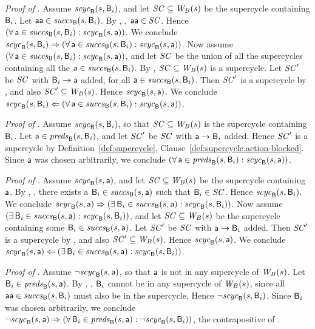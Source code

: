 \textit{Proof of }.
%
Assume $\scyc{\B}{s}{\B_i}$, and let $\SC \sub \wfg{B}{s}$ be the supercycle containing $\B_i$.  Let
$\actp \in \succs{\B}{s}{\B_i}$.  By , ,
$\actp \in \SC$.  Hence $(\fa \act \in \succs{\B}{s}{\B_i} : \scyc{\B}{s}{\act})$.
We conclude
$\scyc{\B}{s}{\B_i} \imp (\fa \act \in \succs{\B}{s}{\B_i} : \scyc{\B}{s}{\act})$.
%
Now assume $(\fa \act \in \succs{\B}{s}{\B_i} : \scyc{\B}{s}{\act})$, and let 
$\SC$ be the union of all the supercycles containing all the $\act \in \succs{\B}{s}{\B_i}$. 
By , $\SC \sub \wfg{B}{s}$ is a supercycle.
Let $\SC'$ be $\SC$ with $\B_i \ar \act$ added, for all 
$\act \in \succs{\B}{s}{\B_i}$.
Then $\SC'$ is a supercycle by 
, and also $\SC' \sub \wfg{B}{s}$. Hence $\scyc{\B}{s}{\act}$.
We conclude 
$\scyc{\B}{s}{\B_i} \folf (\fa \act \in \succs{\B}{s}{\B_i} : \scyc{\B}{s}{\act})$.




\textit{Proof of }.
%
Assume $\scyc{\B}{s}{\B_i}$, so that $\SC \sub \wfg{B}{s}$ is the supercycle containing $\B_i$.
Let  $\act \in \preds{\B}{s}{\B_i}$, and let $\SC'$ be $\SC$ with 
$\act \ar \B_i$ added. Hence $\SC'$ is a supercycle 
by Definition~\ref{def:supercycle},
  Clause~\ref{def:supercycle.action-blocked}.
Since $\act$ was chosen arbitrarily, we conclude 
$(\fa \act \in \preds{\B}{s}{\B_i} : \scyc{\B}{s}{\act})$.



\textit{Proof of }.
%
Assume $\scyc{\B}{s}{\act}$, and let $\SC \sub \wfg{B}{s}$ be the supercycle containing $\act$.  By
, , there exists a
$\B_i \in \succs{\B}{s}{\act}$ such that $\B_i \in \SC$.  Hence $\scyc{\B}{s}{\B_i}$.
We conclude
$\scyc{\B}{s}{\act} \imp (\ex \B_i \in \succs{\B}{s}{\act} : \scyc{\B}{s}{\B_i})$.
%
Now assume $(\ex \B_i \in \succs{\B}{s}{\act} : \scyc{\B}{s}{\B_i})$, and let 
$\SC \sub \wfg{B}{s}$ be the supercycle containing some $\B_i \in \succs{\B}{s}{\act}$. 
Let $\SC'$ be $\SC$ with $\act \ar \B_i$ added. Then $\SC'$ is a supercycle by 
, and also $\SC' \sub \wfg{B}{s}$. Hence $\scyc{\B}{s}{\act}$.
We conclude 
$\scyc{\B}{s}{\act} \folf (\ex \B_i \in \succs{\B}{s}{\act} : \scyc{\B}{s}{\B_i})$.


\textit{Proof of }.  
%
Assume $\neg \scyc{\B}{s}{\act}$, so that $\act$ is not in any supercycle of $\wfg{B}{s}$.
Let $\B_i \in \preds{\B}{s}{\act}$. 
By , , 
$\B_i$ cannot be in any supercycle of $\wfg{B}{s}$, since all $\actp \in \succs{\B}{s}{\B_i}$ must
also be in the supercycle. Hence $\neg \scyc{\B}{s}{\B_i}$.
Since $\B_i$ was chosen arbitrarily, we conclude
$\neg \scyc{\B}{s}{\act} \imp  (\fa \B_i \in \preds{\B}{s}{\act} : \neg \scyc{\B}{s}{\B_i})$, the
contrapositive of .  
\epr


